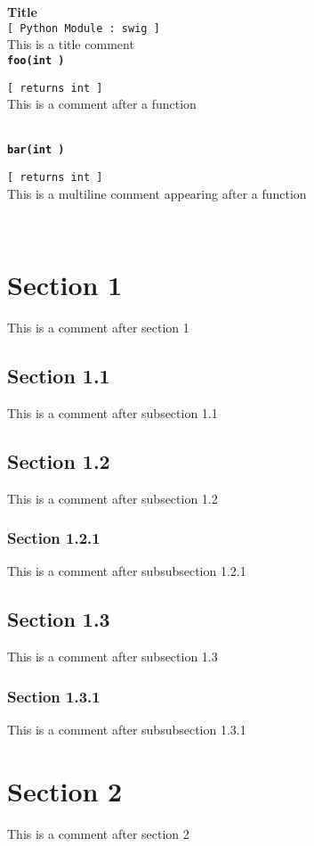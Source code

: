 \setlength{\parindent}{0.0in}
\setlength{\textwidth}{6.5in}
\setlength{\oddsidemargin}{0.0in}
\pagestyle{headings}

{\Large \bf  Title }\\
{\tt [ Python Module : swig ]  }\\
   This is a title comment   
\\{\tt \bf foo(int ) }
\\
\makebox[0.5in]{}\begin{minipage}[t]{6in}
{\tt [ returns int  ]  }\\
   This is a comment after a function   
\\

\end{minipage}\\

{\tt \bf bar(int ) }
\\
\makebox[0.5in]{}\begin{minipage}[t]{6in}
{\tt [ returns int  ]  }\\
   This is a 
   multiline comment
   appearing after
   a function
\\

\end{minipage}\\

\section{Section 1}   This is a comment after section 1   
\\\subsection{Section 1.1}   This is a comment after subsection 1.1   
\\\subsection{Section 1.2}   This is a comment after subsection 1.2   
\\\subsubsection{Section 1.2.1}   This is a comment after subsubsection 1.2.1   
\\\subsection{Section 1.3}   This is a comment after subsection 1.3   
\\\subsubsection{Section 1.3.1}   This is a comment after subsubsection 1.3.1   
\\\section{Section 2}   This is a comment after section 2   
\\


